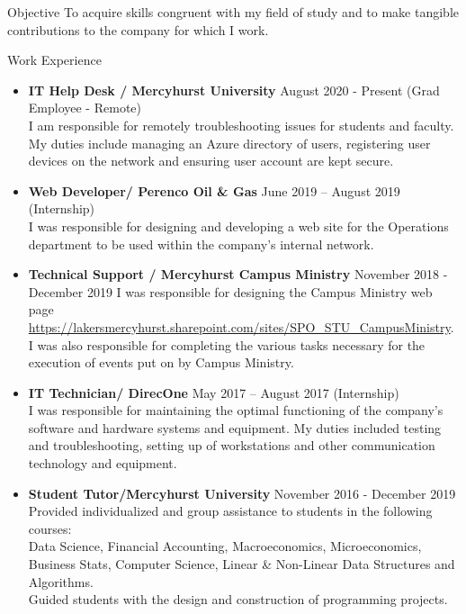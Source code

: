\documentclass[11pt]{resume} %
\newcommand{\bold}[1]{\textbf{#1}}
\begin{document}
	
\begin{rSection}{Objective}
	To acquire skills congruent with my field of study and to make tangible contributions to the company for which I work.
\end{rSection}
\begin{rSection}{Work Experience}
\begin{itemize}
	
	\item\bold{IT Help Desk / Mercyhurst University} \quad August 2020 - Present (Grad Employee - Remote)\\
	I am responsible for remotely troubleshooting issues for students and faculty. My duties include managing an Azure directory of users, registering user devices on the network and ensuring user account are kept secure.
	\\
	
	\item\bold{Web Developer/ Perenco Oil \& Gas} \quad June 2019 – August 2019 (Internship)\\
	I was responsible for designing and developing a web site for the Operations department to be used within the company's internal network.\\
	
	\item\bold{Technical Support / Mercyhurst Campus Ministry} \quad November 2018 - December 2019
	 I was responsible for designing the Campus Ministry web page  \url{https://lakersmercyhurst.sharepoint.com/sites/SPO_STU_CampusMinistry}.\\
	I was also responsible for completing the various tasks necessary for the execution of events put on by Campus Ministry.\\
	
	\item\bold{IT Technician/ DirecOne} \quad May 2017 – August 2017 (Internship)\\
	I was responsible for maintaining the optimal functioning of the company’s software and hardware systems and equipment. My duties included testing and troubleshooting, setting up of workstations and other communication technology and equipment.\\
	
	\item\bold{Student Tutor/Mercyhurst University} \quad November 2016 - December 2019\\
	Provided individualized and group assistance to students in the following courses:\\ Data Science, Financial Accounting, Macroeconomics, Microeconomics, Business Stats, Computer Science, Linear \& Non-Linear Data Structures and Algorithms.\\
	Guided students with the design and construction of programming projects.
	\\
	
\end{itemize}
\end{rSection}
\end{document}
